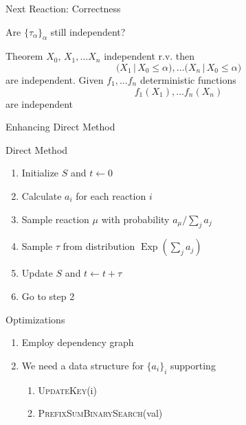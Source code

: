 \documentclass{beamer}
\DeclareMathOperator{\Exp}{\text{Exp}}
\begin{document}
\begin{frame}{Next Reaction: Correctness}
  \begin{center}
  Are $\bigl\{\tau_\alpha\bigr\}_\alpha$ still independent?
\end{center}

  \begin{block}{Theorem}
    $X_0,\, X_1, \dots X_n$ independent r.v. then
    \begin{equation*}
      \bigl(X_1 \,\big|\, X_0 \leq \alpha\bigr), \dots \bigl(X_n \,\big|\, X_0 \leq \alpha\bigr)   
    \end{equation*}
    are independent. Given $f_1,\dots f_n$ deterministic functions
    \begin{equation*}
      f_1(X_1), \dots f_n(X_n)
    \end{equation*}
    are independent
  \end{block}
\end{frame}

\begin{frame}{Enhancing Direct Method}
  \begin{block}{Direct Method}
    \begin{enumerate}
    \item Initialize $S$ and $t\leftarrow 0$ 
    \item Calculate $a_i$ for each reaction $i$
    \item Sample reaction $\mu$ with probability $a_\mu \big/ \sum_j a_j$
    \item Sample $\tau$ from distribution $\Exp\left(\sum_j a_j\right)$
    \item Update $S$ and $t \leftarrow t + \tau$
    \item Go to step 2
    \end{enumerate}
  \end{block}
  \begin{block}{Optimizations}
    \begin{enumerate}
    \item  Employ dependency graph
    \item  We need a data structure for $\bigl\{a_i\bigr\}_i$ supporting
      \begin{enumerate}
      \item \textsc{UpdateKey}(i)
      \item \textsc{PrefixSumBinarySearch}(val)
      \end{enumerate}
    \end{enumerate}
  \end{block}
\end{frame}
\end{document}
